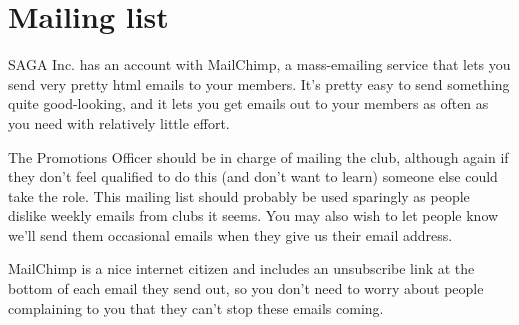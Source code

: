\section{Mailing list}

SAGA Inc. has an account with MailChimp, a mass-emailing service that lets you send very pretty html emails to your members. It's pretty easy to send something quite good-looking, and it lets you get emails out to your members as often as you need with relatively little effort.

The Promotions Officer should be in charge of mailing the club, although again if they don't feel qualified to do this (and don't want to learn) someone else could take the role. This mailing list should probably be used sparingly as people dislike weekly emails from clubs it seems. You may also wish to let people know we'll send them occasional emails when they give us their email address.

MailChimp is a nice internet citizen and includes an unsubscribe link at the bottom of each email they send out, so you don't need to worry about people complaining to you that they can't stop these emails coming.